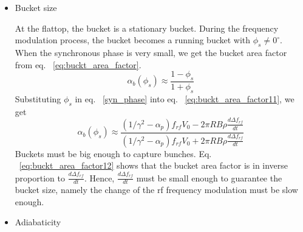\begin{itemize}
\item Bucket size

At the flattop, the bucket is a stationary bucket. During the frequency modulation process, the bucket becomes a running bucket with $\phi_{s}\neq 0^\circ$. When the synchronous phase is very small, we get the bucket area factor from eq. ~\ref{eq:buckt_area_factor}. 
\begin{equation} 
\alpha_b(\phi_{s})\approx \frac{1-\phi_{s}}{1+\phi_{s}}
\label{eq:buckt_area_factor11}
\end{equation} 
Substituting $\phi_{s}$ in eq. ~\ref{syn_phase} into eq. ~\ref{eq:buckt_area_factor11}, we get
\begin{equation} 
\alpha_b(\phi_{s})\approx \frac{(1/\gamma^2-\alpha_p)f_\mathit{rf}V_0-2\pi R B\rho\frac{d \Delta f_\mathit{rf}}{dt}}{(1/\gamma^2-\alpha_p)f_\mathit{rf}V_0+2\pi R B\rho\frac{d \Delta f_\mathit{rf}}{dt}}
\label{eq:buckt_area_factor12}
\end{equation} 
Buckets must be big enough to capture bunches. Eq. ~\ref{eq:buckt_area_factor12} shows that the bucket area factor is in inverse proportion to $\frac{d\Delta f_{\mathit{rf}}}{dt}$. Hence, $\frac{d\Delta f_{\mathit{rf}}}{dt}$ must be small enough to guarantee the bucket size, namely the change of the rf frequency modulation must be slow enough.

\item Adiabaticity 



\end{itemize}

